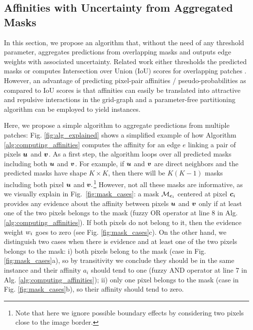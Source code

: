 \subsection{Affinities with Uncertainty from Aggregated Masks}\label{sec:aggr_affs}
In this section, we propose an algorithm that, without the need of any threshold parameter, aggregates predictions from overlapping \maskname masks and outputs edge weights with associated uncertainty.
Related work either thresholds the predicted \maskname masks \cite{januszewski2018high,hirsch2020patchperpix,meirovitch2016multi} or computes Intersection over Union (IoU) scores for overlapping patches \cite{liu2016multi}. However, an advantage of predicting pixel-pair affinities / pseudo-probabilities as compared to IoU scores is that affinities can easily be translated into attractive and repulsive interactions in the grid-graph 
and a parameter-free partitioning algorithm can be employed to yield instances.

Here, we propose a simple algorithm to aggregate predictions from multiple patches: Fig. \ref{fig:alg_explained} shows a simplified example of how Algorithm \ref{alg:computing_affinities} computes the affinity for an edge $e$ linking a pair of pixels $\bm{u}$ and $\bm{v}$.
As a first step, the algorithm loops over all predicted \maskname masks including both $\bm{u}$ and $\bm{v}$. For example, if $\bm{u}$ and $\bm{v}$ are direct neighbors and the predicted masks have shape $K\times K$, then there will be $K(K-1)$ masks including both pixel $\bm{u}$ and $\bm{v}.$\footnote{Note that here we ignore possible boundary effects by considering two pixels close to the image border.} 
However, not all these masks are informative, as we visually explain in Fig.~\ref{fig:mask_cases}: a mask $\mathcal{M}_{\bm{c}_i}$ centered at pixel $\bm{c}_i$ provides any evidence about the affinity between pixels $\bm{u}$ and $\bm{v}$ only if at least one of the two pixels belongs to the mask (fuzzy OR operator at line 8 in Alg. \ref{alg:computing_affinities}).
If both pixels do not belong to it, then the evidence weight $w_i$ goes to zero (see Fig. \ref{fig:mask_cases}c).
On the other hand, we distinguish two cases when there is evidence and at least one of the two pixels belongs to the mask: i)
both pixels belong to the mask  (case in Fig. \ref{fig:mask_cases}a), so by transitivity we conclude they should be in the same instance and their affinity $a_i$ should tend to one (fuzzy AND operator at line 7 in Alg. \ref{alg:computing_affinities}); 
ii) only one pixel belongs to the mask (case in Fig. \ref{fig:mask_cases}b), so their affinity should tend to zero. 

